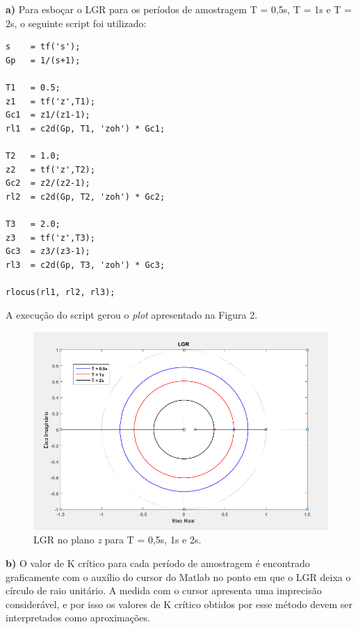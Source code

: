 \documentclass{article}
\begin{document}
    {\textbf{a)} Para esboçar o LGR para os períodos de amostragem T = 0,5s, T = 1s e T = 2s, o seguinte script foi utilizado:}

\vspace{7mm}
\begin{lstlisting}
s    = tf('s');
Gp   = 1/(s+1);

T1   = 0.5;
z1   = tf('z',T1);
Gc1  = z1/(z1-1);
rl1  = c2d(Gp, T1, 'zoh') * Gc1;

T2   = 1.0;
z2   = tf('z',T2);
Gc2  = z2/(z2-1);
rl2  = c2d(Gp, T2, 'zoh') * Gc2;

T3   = 2.0;
z3   = tf('z',T3);
Gc3  = z3/(z3-1);
rl3  = c2d(Gp, T3, 'zoh') * Gc3;

rlocus(rl1, rl2, rl3);

\end{lstlisting}

    \vspace{7mm}
    {A execução do script gerou o \textit{plot} apresentado na Figura 2.}

    \newpage

    \begin{figure}[H]
       \centering
            \includegraphics[width=1\linewidth]{images/LGR.png}
            \caption{LGR no plano \textit{z} para T = 0,5s, 1s e 2s.}
            \label{fig:lgr}
    \end{figure}


    \vspace{7mm}
    {\textbf{b)} O valor de K crítico para cada período de amostragem é encontrado graficamente com o auxílio do cursor do Matlab no ponto em que o LGR deixa o círculo de raio unitário. A medida com o cursor apresenta uma imprecisão considerável, e por isso os valores de K crítico obtidos por esse método devem ser interpretados como aproximações.}
\end{document}
